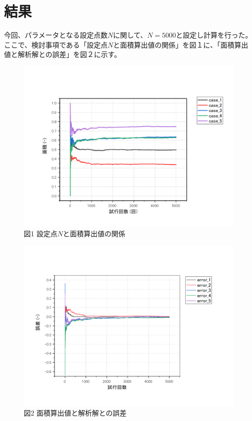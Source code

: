 \documentclass[12pt,a4paper]{jsarticle}
\begin{document}
\section{結果}
今回、パラメータとなる設定点数$N$に関して、$N=5000$と設定し計算を行った。\\
ここで、検討事項である「設定点$N$と面積算出値の関係」を図１に、「面積算出値と解析解との誤差」を図２に示す。
\begin{figure}[h]
    \begin{center}
        \includegraphics[width=180mm]{result.png}
        \caption{図1 設定点$N$と面積算出値の関係}
    \end{center}
\end{figure}
\begin{figure}[h]
    \begin{center}
        \includegraphics[width=180mm]{error.png}
        \caption{図2 面積算出値と解析解との誤差}
    \end{center}
\end{figure}
\end{document}
